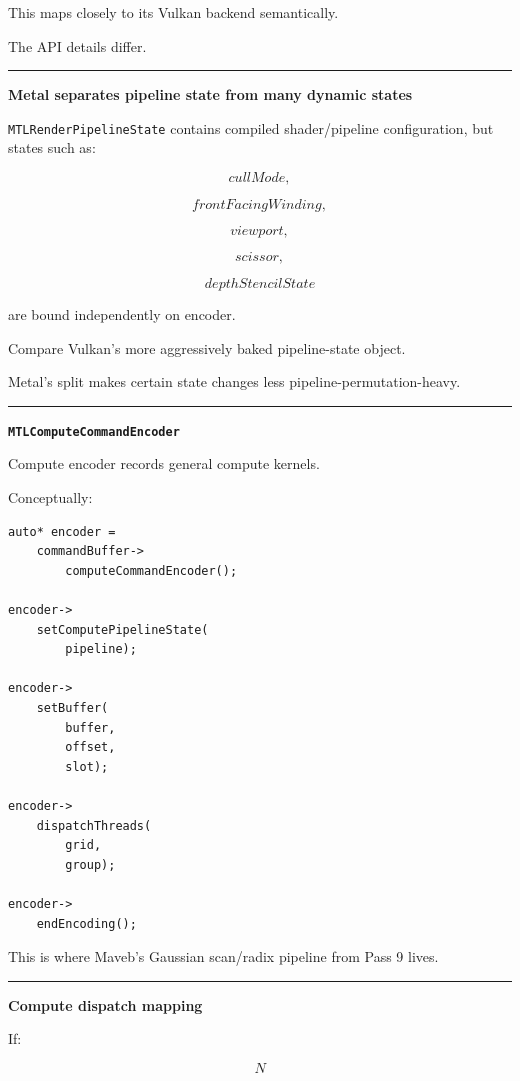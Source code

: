 This maps closely to its Vulkan backend semantically.

The API details differ.

\begin{center}\rule{0.5\linewidth}{0.5pt}\end{center}

\textbf{Metal separates pipeline state from many dynamic states}

\texttt{MTLRenderPipelineState} contains compiled shader/pipeline configuration, but states such as:

\[
cullMode,
\]

\[
frontFacingWinding,
\]

\[
viewport,
\]

\[
scissor,
\]

\[
depthStencilState
\]

are bound independently on encoder.

Compare Vulkan's more aggressively baked pipeline-state object.

Metal's split makes certain state changes less pipeline-permutation-heavy.

\begin{center}\rule{0.5\linewidth}{0.5pt}\end{center}

\textbf{\texttt{MTLComputeCommandEncoder}}

Compute encoder records general compute kernels.

Conceptually:

\begin{verbatim}
auto* encoder =
    commandBuffer->
        computeCommandEncoder();

encoder->
    setComputePipelineState(
        pipeline);

encoder->
    setBuffer(
        buffer,
        offset,
        slot);

encoder->
    dispatchThreads(
        grid,
        group);

encoder->
    endEncoding();
\end{verbatim}

This is where Maveb's Gaussian scan/radix pipeline from Pass 9 lives.

\begin{center}\rule{0.5\linewidth}{0.5pt}\end{center}

\textbf{Compute dispatch mapping}

If:

\[
N
\]

